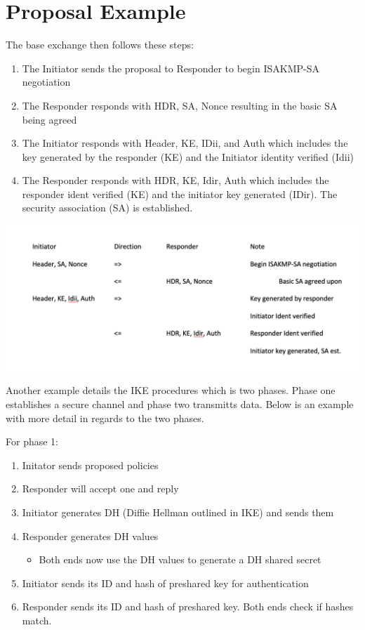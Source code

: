 \documentclass{report}
\newcommand{\squash}{\itemsep=0pt\parskip=0pt}
\begin{document}
\section {Proposal Example}


The base exchange then follows these steps:

\begin{enumerate}
\squash
\item The Initiator sends the proposal to Responder to begin ISAKMP-SA negotiation
\item The Responder responds with HDR, SA, Nonce resulting in the basic SA being agreed 
\item The Initiator responds with Header, KE, IDii, and Auth which includes the key generated by the responder (KE) and the Initiator identity verified (Idii)
\item The Responder responds with HDR, KE, Idir, Auth which includes the responder ident verified (KE) and the initiator key generated (IDir). The security association (SA) is established. 
\end{enumerate}

\includegraphics[width=\textwidth] {ISAKMP_Neg_Procedure}

Another example details the IKE procedures which is two phases. Phase one establishes a secure channel and phase two transmitts data. Below is an example  with more detail in regards to the two phases.

For phase 1:
\begin{enumerate}
\item Initator sends proposed policies
\item Responder will accept one and reply
\item Initiator generates DH (Diffie Hellman outlined in IKE) and sends them
\item Responder generates DH values
  \begin{itemize}
  \item Both ends now use the DH values to generate a DH shared secret
  \end{itemize}
\item Initiator sends its ID and hash of preshared key for authentication
\item Responder sends its ID and hash of preshared key. Both ends check if hashes match.
\end{enumerate}
\end{document}

